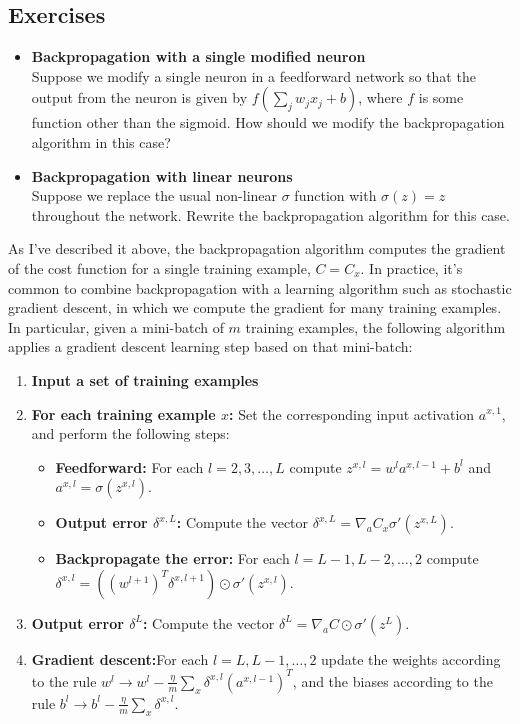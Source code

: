 \subsection*{Exercises}
\label{subs: Exercises backpropgation}

\begin{itemize}
\item \textbf{Backpropagation with a single modified neuron}\\
Suppose we modify a single neuron in a feedforward network so that the output from the neuron is given by $f(\sum_j w_j x_j +b)$, where $f$ is some function other than the sigmoid. How should we modify the backpropagation algorithm in this case?
\item \textbf{Backpropagation with linear neurons}\\
Suppose we replace the usual non-linear $\sigma$ function with $\sigma(z)=z$ throughout the network. Rewrite the backpropagation algorithm for this case.
\end{itemize}

As I've described it above, the backpropagation algorithm computes the gradient of the cost function for a single training example, $C=C_x$. In practice, it's common to combine backpropagation with a learning algorithm such as stochastic gradient descent, in which we compute the gradient for many training examples. In particular, given a mini-batch of $m$ training examples, the following algorithm applies a gradient descent learning step based on that mini-batch:

\begin{enumerate}
\item \textbf{Input a set of training examples}

\item \textbf{For each training example $x$:} Set the corresponding input activation $a^{x,1}$, and perform the following steps:
\begin{itemize}
\item \textbf{Feedforward:} For each $l=2,3,…,L$ compute $z^{x,l}=w^l a^{x,l-1}+b^l$ and $a^{x,l}=\sigma(z^{x,l})$.
\item \textbf{Output error $\delta^{x,L}$:} Compute the vector $\delta^{x,L}=\nabla_a C_x\sigma'(z^{x,L})$.
\item \textbf{Backpropagate the error:} For each $l=L-1,L-2,…,2$ compute $\delta^{x,l}=((w^{l+1})^T\delta^{x,l+1})\odot\sigma'(z^{x,l})$.
\end{itemize}
\item \textbf{Output error $\delta^L$:} Compute the vector $\delta^L=\nabla_a C \odot \sigma'(z^L)$.
\item \textbf{Gradient descent:}For each $l=L,L-1,…,2$ update the weights according to the rule $w^l\rightarrow w^l-\frac{\eta}{m}\sum_x\delta^{x,l}(a^{x,l-1})^T$, and the biases according to the rule $b^l\rightarrow b^l-\frac{\eta}{m}\sum_x\delta^{x,l}$.
\end{enumerate}

